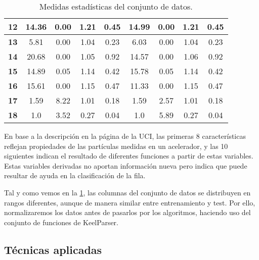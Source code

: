 \begin{table}[]
\begin{tabular}{c|c|c|c|c||c|c|c|c|}
    \multicolumn{1}{|c|}{\textbf{12}}         & 14.36  & 0.00   & 1.21    & 0.45        & 14.99  & 0.00   & 1.21    & 0.45              \\ \hline
    \multicolumn{1}{|c|}{\textbf{13}}         & 5.81   & 0.00   & 1.04    & 0.23        & 6.03   & 0.00   & 1.04    & 0.23              \\ \hline
    \multicolumn{1}{|c|}{\textbf{14}}         & 20.68  & 0.00   & 1.05    & 0.92        & 14.57  & 0.00   & 1.06    & 0.92              \\ \hline
    \multicolumn{1}{|c|}{\textbf{15}}         & 14.89  & 0.05   & 1.14    & 0.42        & 15.78  & 0.05   & 1.14    & 0.42              \\ \hline
    \multicolumn{1}{|c|}{\textbf{16}}         & 15.61  & 0.00   & 1.15    & 0.47        & 11.33  & 0.00   & 1.15    & 0.47              \\ \hline
    \multicolumn{1}{|c|}{\textbf{17}}         & 1.59   & 8.22   & 1.01    & 0.18        & 1.59   & 2.57   & 1.01    & 0.18              \\ \hline
    \multicolumn{1}{|c|}{\textbf{18}}         & 1.0    & 3.52   & 0.27    & 0.04        & 1.0    & 5.89   & 0.27    & 0.04              \\ \hline
    \end{tabular}
    \caption{Medidas estadísticas del conjunto de datos.}
    \label{statistics}
\end{table}

En base a la descripción en la página de la UCI, las primeras 8 características reflejan propiedades de las partículas medidas en un acelerador, y las 10 siguientes indican el resultado de diferentes funciones a partir de estas variables. Estas variables derivadas no aportan información nueva pero indica que puede resultar de ayuda en la clasificación de la fila.

Tal y como vemos en la \ref{statistics}, las columnas del conjunto de datos se distribuyen en rangos diferentes, aunque de manera similar entre entrenamiento y test. Por ello, normalizaremos los datos antes de pasarlos por los algoritmos, haciendo uso del conjunto de funciones de KeelParser.

\subsection{Técnicas aplicadas}


